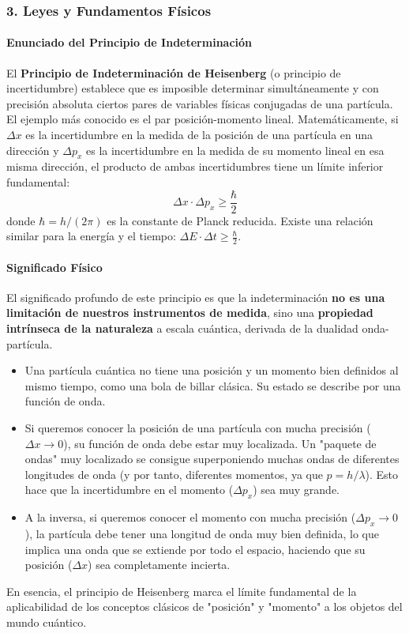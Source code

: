 \subsubsection*{3. Leyes y Fundamentos Físicos}
\paragraph{Enunciado del Principio de Indeterminación}
El \textbf{Principio de Indeterminación de Heisenberg} (o principio de incertidumbre) establece que es imposible determinar simultáneamente y con precisión absoluta ciertos pares de variables físicas conjugadas de una partícula. El ejemplo más conocido es el par posición-momento lineal.
Matemáticamente, si $\Delta x$ es la incertidumbre en la medida de la posición de una partícula en una dirección y $\Delta p_x$ es la incertidumbre en la medida de su momento lineal en esa misma dirección, el producto de ambas incertidumbres tiene un límite inferior fundamental:
$$ \Delta x \cdot \Delta p_x \ge \frac{\hbar}{2} $$
donde $\hbar = h/(2\pi)$ es la constante de Planck reducida. Existe una relación similar para la energía y el tiempo: $\Delta E \cdot \Delta t \ge \frac{\hbar}{2}$.

\paragraph{Significado Físico}
El significado profundo de este principio es que la indeterminación \textbf{no es una limitación de nuestros instrumentos de medida}, sino una \textbf{propiedad intrínseca de la naturaleza} a escala cuántica, derivada de la dualidad onda-partícula.
\begin{itemize}
    \item Una partícula cuántica no tiene una posición y un momento bien definidos al mismo tiempo, como una bola de billar clásica. Su estado se describe por una función de onda.
    \item Si queremos conocer la posición de una partícula con mucha precisión ($\Delta x \to 0$), su función de onda debe estar muy localizada. Un "paquete de ondas" muy localizado se consigue superponiendo muchas ondas de diferentes longitudes de onda (y por tanto, diferentes momentos, ya que $p=h/\lambda$). Esto hace que la incertidumbre en el momento ($\Delta p_x$) sea muy grande.
    \item A la inversa, si queremos conocer el momento con mucha precisión ($\Delta p_x \to 0$), la partícula debe tener una longitud de onda muy bien definida, lo que implica una onda que se extiende por todo el espacio, haciendo que su posición ($\Delta x$) sea completamente incierta.
\end{itemize}
En esencia, el principio de Heisenberg marca el límite fundamental de la aplicabilidad de los conceptos clásicos de "posición" y "momento" a los objetos del mundo cuántico.

